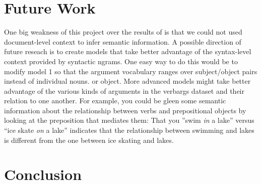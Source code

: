 \documentclass{article} %
\begin{document}
\section{Future Work}
One big weakness of this project over the results of \citet{oconnor2013} is that 
we could not used document-level context to infer semantic information.
A possible direction of future reseach is to create models that take better 
advantage of the syntax-level context provided by syntactic ngrams. 
One easy way to do this would be to modify model 1 so that the argument 
vocabulary ranges over subject/object pairs instead of individual nouns.
or object.
More advanced models might take better advantage of the various kinds of arguments
in the verbargs dataset and their relation to one another.
For example, you could be gleen some semantic information about the relationship between
verbs and prepositional objects by looking at the preposition that mediates them: 
That you ''swim \emph{in} a lake'' versus ``ice skate \emph{on} a lake'' 
indicates that the relationship between swimming and lakes is different from the one between
ice skating and lakes.

\section{Conclusion}



\end{document}
